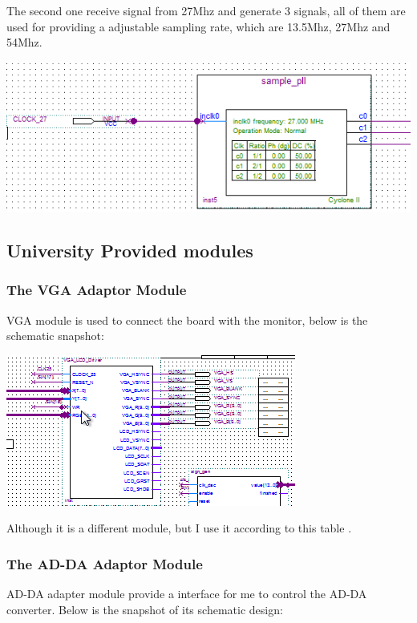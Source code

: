 \documentclass[11pt]{scrartcl}
\begin{document}
The second one receive signal from 27Mhz and generate 3 signals, all of them are used for providing a adjustable sampling rate, which are 13.5Mhz, 27Mhz and 54Mhz. 

\begin{minipage}[t]{\linewidth}

{
\includegraphics[scale = 0.5]{pll2.png}
}
\end{minipage}
\medskip

\subsection{University Provided modules}
\subsubsection{The VGA Adaptor Module}
\label{sec:vga}
VGA module is used to connect the board with the monitor, below is the schematic snapshot:

\begin{minipage}[t]{\linewidth}

{
\includegraphics[scale = 1]{vga.png}
}
\end{minipage}
\medskip

Although it is a different module, but I use it according to this table \cite{vgaadaptor}.

\subsubsection{The AD-DA Adaptor Module}
\label{sec:adda}
AD-DA adapter module provide a interface for me to control the AD-DA converter. Below is the snapshot of its schematic design:
\end{document}
